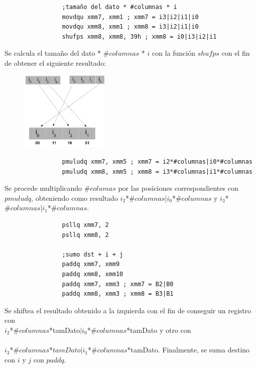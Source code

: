 \documentclass[10pt, a4paper]{article}
\begin{document}
\begin{enumerate}
\begin{verbatim}
                ;tamaño del dato * #columnas * i              
                movdqu xmm7, xmm1 ; xmm7 = i3|i2|i1|i0
                movdqu xmm8, xmm1 ; xmm8 = i3|i2|i1|i0         
                shufps xmm8, xmm8, 39h ; xmm8 = i0|i3|i2|i1
\end{verbatim}
Se calcula el tamaño del dato * $\#columnas$ * $i$ con la función $shufps$ con el fin de obtener el siguiente resultado:
\begin{figure}[H] %
\begin{center}
\includegraphics[width=120pt]{../imgs/arreglo1.jpg}
\end{center}
\end{figure}
\begin{verbatim}
                pmuludq xmm7, xmm5 ; xmm7 = i2*#columnas|i0*#columnas
                pmuludq xmm8, xmm5 ; xmm8 = i3*#columnas|i1*#columnas
\end{verbatim}
Se procede multiplicando $\#columas$ por las posiciones correspondientes con $pmuludq$, obteniendo como resultado $i_{2}$*$\#columnas$|$i_{0}$*$\#columnas$ y $i_{3}$*$\#columnas$|$i_{1}$*$\#columnas$.               
\begin{verbatim}            
                psllq xmm7, 2
                psllq xmm8, 2
               
                ;sumo dst + i + j
                paddq xmm7, xmm9
                paddq xmm8, xmm10
                paddq xmm7, xmm3 ; xmm7 = B2|B0
                paddq xmm8, xmm3 ; xmm8 = B3|B1
\end{verbatim}
Se shiftea el resultado obtenido a la izquierda con el fin de conseguir un registro con\\
 $i_{2}$*$\#columnas$*tamDato$|i_{0}$*$\#columnas$*tamDato y otro con \\\\
 $i_{3}$*$\#columnas$*$tamDato|i_{1}$*$\#columnas$*tamDato. Finalmente, se suma destino con $i$ y $j$ con $paddq$.


\end{enumerate}
\end{document}
